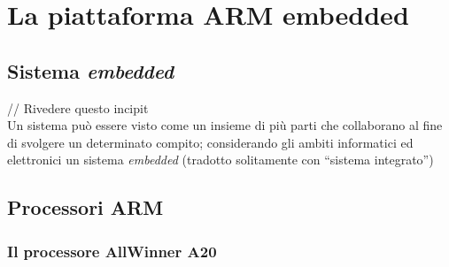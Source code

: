 
\chapter{La piattaforma ARM embedded} %

\label{Chapter5} %



\section{Sistema \emph{embedded}}

// Rivedere questo incipit \\
Un sistema può essere visto come un insieme di più parti che collaborano al fine
di svolgere un determinato compito; considerando gli  ambiti informatici ed 
elettronici un sistema \emph{embedded} (tradotto solitamente con ``sistema 
integrato'') 


\section{Processori ARM}


\subsection{Il processore AllWinner A20}


